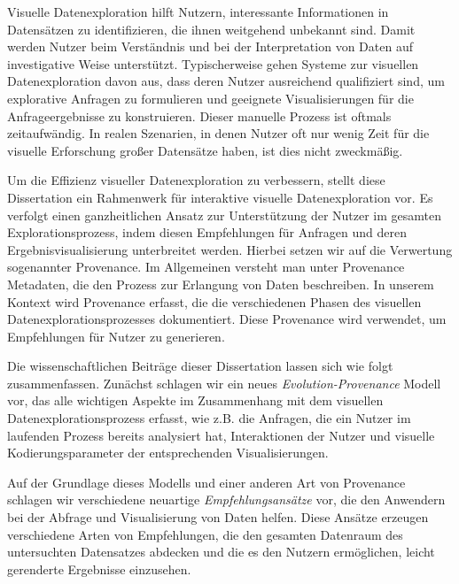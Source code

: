 Visuelle Datenexploration hilft Nutzern, interessante Informationen in Datens\"atzen zu identifizieren, die ihnen weitgehend unbekannt sind. Damit werden Nutzer beim Verst\"andnis und bei der Interpretation von Daten auf investigative Weise unterst\"utzt. Typischerweise gehen Systeme zur visuellen Datenexploration davon aus, dass deren Nutzer ausreichend qualifiziert sind, um explorative Anfragen zu formulieren und geeignete Visualisierungen f\"ur die Anfrageergebnisse zu konstruieren. Dieser manuelle Prozess ist oftmals zeitaufw\"andig. In realen Szenarien, in denen Nutzer oft nur wenig Zeit f\"ur die visuelle Erforschung gro\ss{}er Datens\"atze haben, ist dies nicht zweckm\"a\ss{}ig.

Um die Effizienz visueller Datenexploration zu verbessern, stellt diese Dissertation ein Rahmenwerk für interaktive visuelle Datenexploration vor. Es verfolgt einen ganzheitlichen Ansatz zur Unterst\"utzung der Nutzer im gesamten Explorationsprozess, indem diesen Empfehlungen für Anfragen und deren Ergebnisvisualisierung unterbreitet werden.
Hierbei setzen wir auf die Verwertung sogenannter Provenance. Im Allgemeinen versteht man unter Provenance Metadaten, die den Prozess zur Erlangung von Daten beschreiben. In unserem Kontext wird Provenance erfasst, die die verschiedenen Phasen des visuellen Datenexplorationsprozesses dokumentiert. Diese Provenance wird verwendet, um Empfehlungen f\"ur Nutzer zu generieren. %



Die wissenschaftlichen Beitr\"age dieser Dissertation lassen sich wie folgt zusammenfassen. Zun\"achst schlagen wir 
ein neues \emph{Evolution-Provenance} Modell vor, das alle wichtigen Aspekte im Zusammenhang mit dem visuellen Datenexplorationsprozess erfasst, wie z.B. die Anfragen, die ein Nutzer im laufenden Prozess bereits analysiert hat, Interaktionen der Nutzer und visuelle Kodierungsparameter der entsprechenden Visualisierungen.

Auf der Grundlage dieses Modells und einer anderen Art von Provenance schlagen wir verschiedene neuartige \emph{Empfehlungsans\"atze} vor, die den Anwendern bei der Abfrage und Visualisierung von Daten helfen. Diese Ans\"atze erzeugen verschiedene Arten von Empfehlungen, die den gesamten Datenraum des untersuchten Datensatzes abdecken und die es den Nutzern erm\"oglichen, leicht gerenderte Ergebnisse einzusehen.

